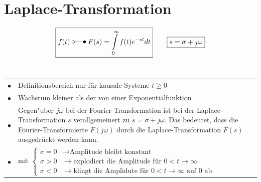 
\section{Laplace-Transformation}
	$$\boxed{f(t) \; \laplace \; F(s)=\int\limits_0^\infty f(t)e^{-st}dt} \qquad \boxed{ s=\sigma+j\omega}$$\\
	\begin{tabular}{p{0.5cm}p{17.5cm}}
		$\bullet$ & Definitionsbereich nur für kausale Systeme $t\geq 0$\\
		$\bullet$ & Wachstum kleiner als der von einer Exponentialfunktion\\ 
		$\bullet$ & Gegen"uber $j\omega$ bei der Fourier-Transformation ist bei der
			Laplace-Transformation $s$ verallgemeinert zu $s=\sigma + j\omega$. Das
			bedeutet, dass die Fourier-Transformierte $F(j\omega)$ durch die
			Laplace-Transformation $F(s)$ ausgedr\"uckt werden kann. \\
		$\bullet$ & mit 
		$\begin{cases} 
		\sigma = 0 & \rightarrow \text{Amplitude bleibt konstant} \\ 
		\sigma > 0 & \rightarrow \text{explodiert die Amplitude f\"ur } 0 < t \rightarrow \infty \\
		\sigma < 0 & \rightarrow \text{klingt die Amplidute für } 0 < t \rightarrow \infty \text{ auf $0$ ab} \
		 \end{cases} $ \\   
	\end{tabular}
	
